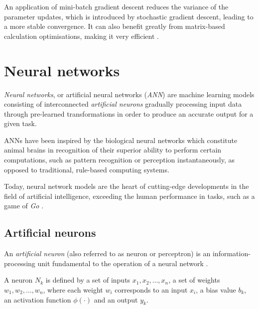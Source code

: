 An application of mini-batch gradient descent reduces the variance of the parameter updates, which is introduced by stochastic gradient descent, leading to a more stable convergence. It can also benefit greatly from matrix-based calculation optimisations, making it very efficient \cite{gradient_descent_ruder}.


\section{Neural networks}

\emph{Neural networks}, or artificial neural networks (\emph{ANN}) are machine learning models consisting of interconnected \emph{artificial neurons} gradually processing input data through pre-learned transformations in order to produce an accurate output for a given task.

ANNs have been inspired by the biological neural networks which constitute animal brains in recognition of their superior ability to perform certain computations, such as pattern recognition or perception \cite{haykin_nn} instantaneously, as opposed to traditional, rule-based computing systems.

Today, neural network models are the heart of cutting-edge developments in the field of artificial intelligence, exceeding the human performance in tasks, such as a game of \emph{Go} \cite{mastering_go}.


\subsection{Artificial neurons}

An \emph{artificial neuron} (also referred to as neuron or perceptron) is an information-processing unit fundamental to the operation of a neural network \cite{haykin_nn}.

A neuron $N_k$ is defined by a set of inputs $x_1, x_2, \dots, x_n$, a set of weights $w_1, w_2, \dots, w_n$, where each weight $w_i$ corresponds to an input $x_i$, a bias value $b_k$, an activation  function $\phi( \cdot )$ and an output $y_k$. 

